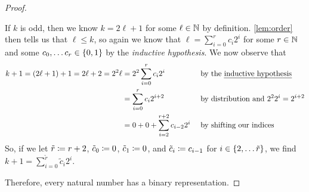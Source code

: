 \begin{proof}
\begin{case}
\begin{case}[Case 2]
            If $k$ is odd, then we know $k = 2 \ell + 1$ for some $\ell \in \mathbb{N}$ by definition.
            \autoref{lem:order} then tells us that $\ell \leq k$,
            so again we know that $\ell = \sum_{i = 0}^{r}c_i 2^i$
            for some $r \in \mathbb{N}$ and some $c_0, \dots c_r \in \set*{0, 1}$
            by the \emph{inductive hypothesis}.
            We now observe that
            \begin{alignat*}{2}
                k + 1 = \pn*{2\ell + 1} + 1 = 2\ell + 2 = 2^2 \ell
                      &= 2^2 \sum_{i = 0}^{r}c_i 2^i &&\text{ by the \emph{inductive hypothesis}}\\
                      &= \sum_{i = 0}^{r}c_i 2^{i + 2} &&\text{ by distribution and } 2^2 2^i = 2^{i + 2}\\
                      &= 0 + 0 + \sum_{i = 2}^{r + 2}c_{i - 2}2^i &&\text{ by shifting our indices}
            \end{alignat*}
            So, if we let $\tilde{r} \coloneqq r + 2$, $\tilde{c}_0 \coloneqq 0$, $\tilde{c}_1 \coloneqq 0$,
            and $\tilde{c}_i \coloneqq c_{i - 1}$ for $i \in \set*{2, \dots \tilde{r}}$,
            we find $k + 1 = \sum_{i = 0}^{\tilde{r}}\tilde{c}_i 2^i$.
        \end{case}
    \end{case}
    Therefore, every natural number has a binary representation.
\end{proof}


